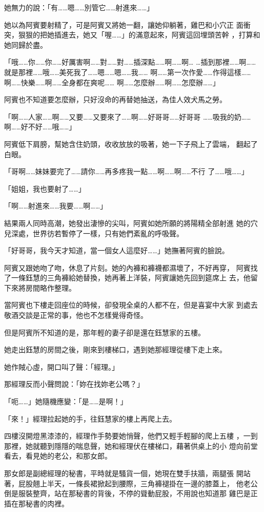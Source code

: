 她無力的說：「有……嗯……別管它……射進來……」

她以為阿賓要射精了，可是阿賓又將她一翻，讓她仰躺著，雞巴和小穴正
面衝突，狠狠的把她插進去，她又「喔……」的滿意起來，阿賓這回埋頭苦幹
，打算和她同歸於盡。

「哦……你……你……好厲害啊……對……對……插深點……啊……啊…
…插到那裡……啊……就是那裡……哦……美死我了……嗯……嗯……我……
啊……第一次作愛……作得這樣……啊……快樂……啊……全身都在爽呢……
啊……怎麼辦……啊……怎麼辦……」

阿賓也不知道要怎麼辦，只好沒命的再替她抽送，為佳人效犬馬之勞。

「啊……人家……啊……又要……又要來了……啊……好哥哥……好哥哥
……吸我的奶……啊……好不好……哦……」

阿賓低下肩膀，幫她含住奶頭，收收放放的吸著，她一下子飛上了雲端，
翻起了白眼。

「哥啊……妹妹要完了……請你……再多疼我一點……啊……啊……不行
了……哦……」

「姐姐，我也要射了……」

「啊……射進來……我要……啊……」

結果兩人同時高潮，她發出淒慘的尖叫，阿賓如她所願的將陽精全部射進
她的穴兒深處，世界彷若暫停了一樣，只有她們紊亂的呼吸聲。

「好哥哥，我今天才知道，當一個女人這麼好……」她撫著阿賓的臉說。

阿賓又跟她吻了吻，休息了片刻。她的內褲和褲襪都濕壞了，不好再穿，
阿賓找了一條鈺慧的三角褲給她替換，她再著上洋裝，阿賓讓她先回到筵席上
去，他留下來將房間略作整理。

當阿賓也下樓走回座位的時候，卻發現全桌的人都不在，但是喜宴中大家
到處去敬酒交談是正常的事，他也不怎樣覺得奇怪。

但是阿賓所不知道的是，那年輕的妻子卻是還在鈺慧家的五樓。

她走出鈺慧的房間之後，剛來到樓梯口，遇到她那經理從樓下走上來。

她作賊心虛，開口叫了聲：「經理。」

那經理反而小聲問說：「妳在找妳老公嗎？」

「呃……」她隨機應變：「是……是啊！」

「來！」經理拉起她的手，往鈺慧家的樓上再爬上去。

四樓沒開燈黑漆漆的，經理作手勢要她悄聲，他們又輕手輕腳的爬上五樓
，一到那裡，她就聽到隱隱的喘息聲，她和經理伏在樓梯口，藉著供桌上的小
燈向前堂看去，看見她的老公，和那女郎。

那女郎是副總經理的秘書，平時就是騷貨一個，她現在雙手扶牆，兩腿張
開站著，屁股翹上半天，一條長裙掀起到腰際，三角褲褪掛在一邊的膝蓋上，
他老公倒是服裝整齊，站在那秘書的背後，不停的聳動屁股，不用說也知道那
雞巴是正插在那秘書的肉裡。

